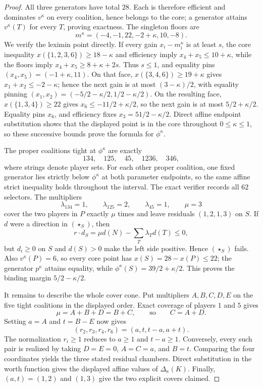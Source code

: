 \begin{proof}
All three generators have total $28$.  Each is therefore efficient and
dominates $v^\kappa$ on every coalition, hence belongs to the core; a
generator attains $v^\kappa(T)$ for every $T$, proving exactness.  The
singleton floors are
\[
 m^\kappa=(-4,-1,22,-2+\kappa,10,-8).
\]
We verify the leximin point directly.  If every gain $x_i-m_i^\kappa$ is at
least $s$, the core inequality
$x(\{1,2,3,6\})\geq18-\kappa$ and efficiency imply
$x_4+x_5\leq10+\kappa$, while the floors imply
$x_4+x_5\geq8+\kappa+2s$.  Thus $s\leq1$, and equality pins
$(x_4,x_5)=(-1+\kappa,11)$.  On that face,
$x(\{3,4,6\})\geq19+\kappa$ gives
$x_1+x_2\leq-2-\kappa$; hence the next gain is at most
$(3-\kappa)/2$, with equality pinning
$(x_1,x_2)=(-5/2-\kappa/2,1/2-\kappa/2)$.  On the resulting face,
$x(\{1,3,4\})\geq22$ gives $x_6\leq-11/2+\kappa/2$, so the next gain is at
most $5/2+\kappa/2$.  Equality pins $x_6$, and efficiency fixes
$x_3=51/2-\kappa/2$.  Direct affine endpoint substitution shows that the
displayed point is in the core throughout $0\leq\kappa\leq1$, so these
successive bounds prove the formula for $\phi^\kappa$.

The proper coalitions tight at $\phi^\kappa$ are exactly
\[
 134,\quad125,\quad45,\quad1236,\quad346,
\]
where strings denote player sets.  For each other proper coalition, one fixed
generator lies strictly below $\phi^\kappa$ at both parameter endpoints, so
the same affine strict inequality holds throughout the interval.  The exact
verifier records all $62$ selectors.  The multipliers
\[
 \lambda_{134}=1,\qquad \lambda_{125}=2,
 \qquad\lambda_{45}=1,\qquad \mu=3
\]
cover the two players in $P$ exactly $\mu$ times and leave residuals
$(1,2,1,3)$ on $S$.  If $d$ were a direction in $(\star_S)$, then
\[
 r\mathbin{\cdot}d_S
 =\mu d(N)-\sum_T\lambda_Td(T)\leq0,
\]
but $d_i\geq0$ on $S$ and $d(S)>0$ make the left side positive.  Hence
$(\star_S)$ fails.  Also $v^\kappa(P)=6$, so every core point has
$x(S)=28-x(P)\leq22$; the generator $p^\kappa$ attains equality, while
$\phi^\kappa(S)=39/2+\kappa/2$.  This proves the binding margin
$5/2-\kappa/2$.

It remains to describe the whole cover cone.  Put multipliers $A,B,C,D,E$
on the five tight coalitions in the displayed order.  Exact coverage of
players $1$ and $5$ gives
\[
 \mu=A+B+D=B+C,
 \qquad\text{so}\qquad C=A+D.
\]
Setting $a=A$ and $t=B-E$ now gives
\[
 (r_2,r_3,r_4,r_6)=(a,t,t-a,a+t).
\]
The normalization $r_i\geq1$ reduces to $a\geq1$ and $t-a\geq1$.
Conversely, every such pair is realized by taking
$D=E=0$, $A=C=a$, and $B=t$.  Comparing the four coordinates yields the
three stated residual chambers.  Direct substitution in the worth function
gives the displayed affine values of $\Delta_\kappa(K)$.  Finally,
$(a,t)=(1,2)$ and $(1,3)$ give the two explicit covers claimed.
\end{proof}

